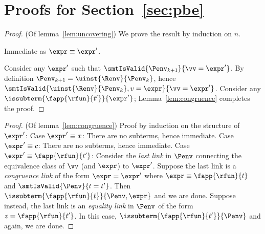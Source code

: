 \section{Proofs for Section~\ref{sec:pbe}}

\begin{proof} (Of lemma~\ref{lem:uncovering})
We prove the result by induction on $n$.

Immediate as $\expr \equiv \expr'$.

Consider any $\expr'$ such that $\smtIsValid{\Penv_{k+1}}{\vv = \expr'}$.
By definition $\Penv_{k+1} = \uinst{\Renv}{\Penv_k}$, hence
$\smtIsValid{\uinst{\Renv}{\Penv_k}, v = \expr}{\vv = \expr'}$.
Consider any $\issubterm{\fapp{\rfun}{t'}}{\expr'}$;
Lemma~\ref{lem:congruence} completes the proof.
\end{proof}


\begin{proof} (Of lemma~\ref{lem:congruence})
%
Proof by induction on the structure of $\expr'$:
%
Case $\expr' \equiv x$:
  There are no subterms, hence immediate.
%
Case $\expr' \equiv c$:
  There are no subterms, hence immediate.
%
Case $\expr' \equiv \fapp{\rfun}{t'}$:
  Consider the \emph{last link} in $\Penv$
  connecting the equivalence class
  of $\vv$ (and $\expr$) to $\expr'$.
  Suppose the last link is a \emph{congruence link}
  of the form $\expr = \expr'$ where
  $\expr \equiv \fapp{\rfun}{t}$ and
  $\smtIsValid{\Penv}{t = t'}$.
  Then $\issubterm{\fapp{\rfun}{t}}{\Penv, \expr}$
  and we are done.
  Suppose instead, the last link is an \emph{equality link}
  in $\Penv$ of the form $z = \fapp{\rfun}{t'}$.
  In this case, $\issubterm{\fapp{\rfun}{t'}}{\Penv}$
  and again, we are done.
\end{proof}


